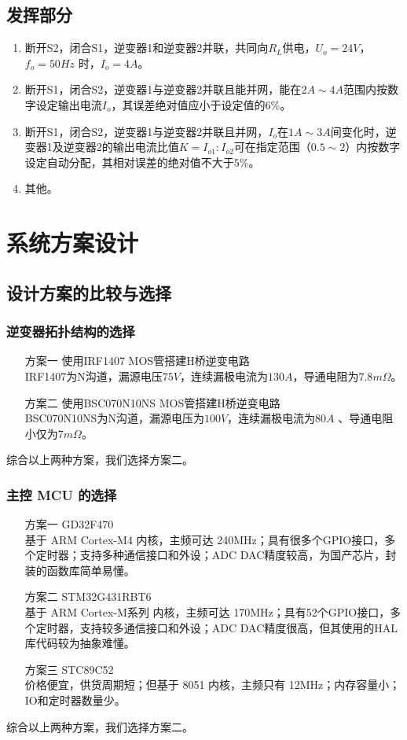 \documentclass[a4paper,12pt]{article}
\begin{document}
\subsection{发挥部分}
\begin{enumerate}
    \item 断开S2，闭合S1，逆变器1和逆变器2并联，共同向$R_L$供电，$U_o=24V$， $f_o=50Hz$ 时，$I_o=4A$。
    \item 断开S1，闭合S2，逆变器1与逆变器2并联且能并网，能在$2A\sim4A$范围内按数字设定输出电流$I_o$，其误差绝对值应小于设定值的$6\%$。
    \item 断开S1，闭合S2，逆变器1与逆变器2并联且并网，$I_o$在$1A\sim 3A$间变化时，逆变器1及逆变器2的输出电流比值$K=I_{o1}:I_{o2}$可在指定范围（$0.5\sim 2$）内按数字设定自动分配，其相对误差的绝对值不大于$5\%$。
    \item 其他。
\end{enumerate}

\newpage

\section{系统方案设计}
\subsection{设计方案的比较与选择}

\subsubsection{逆变器拓扑结构的选择}
\begin{enumerate}
    \item[方案一] 使用IRF1407 MOS管搭建H桥逆变电路 \\ IRF1407为N沟道，漏源电压$75V$，连续漏极电流为$130A$，导通电阻为$7.8m\Omega$。
    \item[方案二] 使用BSC070N10NS MOS管搭建H桥逆变电路 \\ BSC070N10NS为N沟道，漏源电压为$100V$，连续漏极电流为$80A$ 、导通电阻小仅为$7m\Omega$。
\end{enumerate}
综合以上两种方案，我们选择方案二。

\subsubsection{主控 MCU 的选择}
\begin{enumerate}
    \item[方案一] GD32F470 \\ 基于 ARM Cortex-M4 内核，主频可达 240MHz；具有很多个GPIO接口，多个定时器；支持多种通信接口和外设；ADC DAC精度较高，为国产芯片，封装的函数库简单易懂。
    \item[方案二] STM32G431RBT6 \\ 基于 ARM Cortex-M系列 内核，主频可达 170MHz；具有52个GPIO接口，多个定时器，支持较多通信接口和外设；ADC DAC精度很高，但其使用的HAL库代码较为抽象难懂。    
    \item[方案三] STC89C52 \\ 价格便宜，供货周期短；但基于 8051 内核，主频只有 12MHz；内存容量小；IO和定时器数量少。
\end{enumerate}
综合以上两种方案，我们选择方案二。
\end{document}
